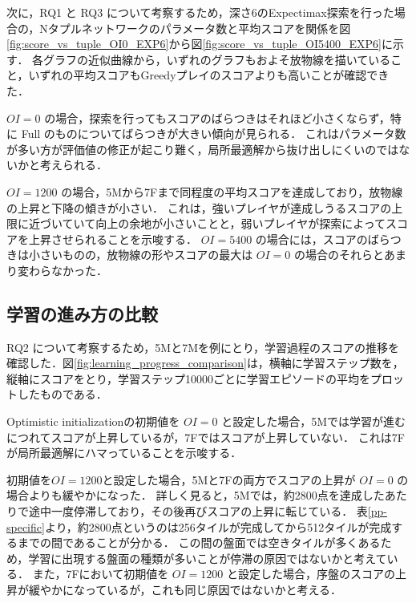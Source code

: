 次に，RQ1 と RQ3 について考察するため，深さ6のExpectimax探索を行った場合の，Nタプルネットワークのパラメータ数と平均スコアを関係を図\ref{fig:score_vs_tuple_OI0_EXP6}から図\ref{fig:score_vs_tuple_OI5400_EXP6}に示す．
各グラフの近似曲線から，いずれのグラフもおよそ放物線を描いていること，いずれの平均スコアもGreedyプレイのスコアよりも高いことが確認できた．

$\mathit{OI}=0$ の場合，探索を行ってもスコアのばらつきはそれほど小さくならず，特に Full のものについてばらつきが大きい傾向が見られる．
これはパラメータ数が多い方が評価値の修正が起こり難く，局所最適解から抜け出しにくいのではないかと考えられる．

$\mathit{OI}=1200$ の場合，\textsf{5M}から\textsf{7F}まで同程度の平均スコアを達成しており，放物線の上昇と下降の傾きが小さい．
これは，強いプレイヤが達成しうるスコアの上限に近づいていて向上の余地が小さいことと，弱いプレイヤが探索によってスコアを上昇させられることを示唆する．
$\mathit{OI}=5400$ の場合には，スコアのばらつきは小さいものの，放物線の形やスコアの最大は $\mathit{OI}=0$ の場合のそれらとあまり変わらなかった．


\subsection{学習の進み方の比較}

RQ2 について考察するため，\textsf{5M}と\textsf{7M}を例にとり，学習過程のスコアの推移を確認した．図\ref{fig:learning_progress_comparison}は，横軸に学習ステップ数を，縦軸にスコアをとり，学習ステップ10000ごとに学習エピソードの平均をプロットしたものである．

Optimistic initializationの初期値を $\mathit{OI}=0$ と設定した場合，\textsf{5M}では学習が進むにつれてスコアが上昇しているが，\textsf{7F}ではスコアが上昇していない．
これは\textsf{7F}が局所最適解にハマっていることを示唆する．

初期値を$\mathit{OI}=1200$と設定した場合，\textsf{5M}と\textsf{7F}の両方でスコアの上昇が $\mathit{OI}=0$ の場合よりも緩やかになった．
詳しく見ると，\textsf{5M}では，約2800点を達成したあたりで途中一度停滞しており，その後再びスコアの上昇に転じている．
表\ref{pp-specific}より，約2800点というのは256タイルが完成してから512タイルが完成するまでの間であることが分かる．
この間の盤面では空きタイルが多くあるため，学習に出現する盤面の種類が多いことが停滞の原因ではないかと考えている．
また，\textsf{7F}において初期値を $\mathit{OI}=1200$ と設定した場合，序盤のスコアの上昇が緩やかになっているが，これも同じ原因ではないかと考える．

